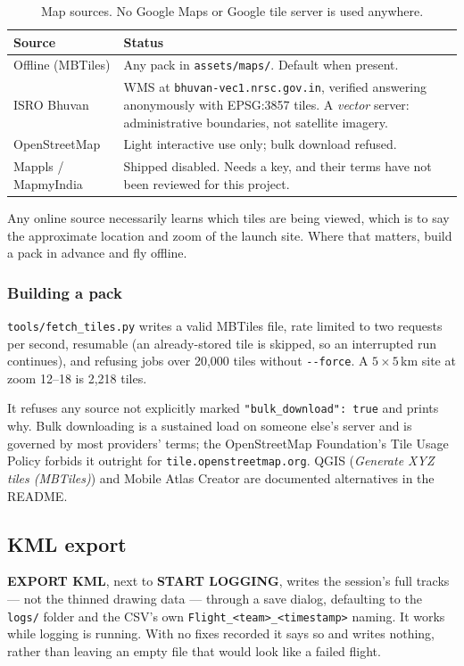 \documentclass[11pt,a4paper]{article}
\begin{document}
\begin{table}[htbp]
\centering
\begin{tabularx}{\textwidth}{@{}lX@{}}
\toprule
\textbf{Source} & \textbf{Status} \\
\midrule
Offline (MBTiles) & Any pack in \texttt{assets/maps/}. Default when present. \\
ISRO Bhuvan & WMS at \texttt{bhuvan-vec1.nrsc.gov.in}, verified answering
anonymously with EPSG:3857 tiles. A \emph{vector} server: administrative
boundaries, not satellite imagery. \\
OpenStreetMap & Light interactive use only; bulk download refused. \\
Mappls / MapmyIndia & Shipped disabled. Needs a key, and their terms have
not been reviewed for this project. \\
\bottomrule
\end{tabularx}
\caption{Map sources. No Google Maps or Google tile server is used anywhere.}
\end{table}

Any online source necessarily learns which tiles are being viewed, which is
to say the approximate location and zoom of the launch site. Where that
matters, build a pack in advance and fly offline.

\subsubsection{Building a pack}

\texttt{tools/fetch\_tiles.py} writes a valid MBTiles file, rate limited to
two requests per second, resumable (an already-stored tile is skipped, so an
interrupted run continues), and refusing jobs over 20{,}000 tiles without
\texttt{-{}-force}. A $5\times5$\,km site at zoom 12--18 is 2{,}218 tiles.

It refuses any source not explicitly marked \texttt{"bulk\_download": true}
and prints why. Bulk downloading is a sustained load on someone else's
server and is governed by most providers' terms; the OpenStreetMap
Foundation's Tile Usage Policy forbids it outright for
\texttt{tile.openstreetmap.org}. QGIS (\emph{Generate XYZ tiles (MBTiles)})
and Mobile Atlas Creator are documented alternatives in the README.

\subsection{KML export}

\textbf{EXPORT KML}, next to \textbf{START LOGGING}, writes the session's
full tracks --- not the thinned drawing data --- through a save dialog,
defaulting to the \texttt{logs/} folder and the CSV's own
\texttt{Flight\_<team>\_<timestamp>} naming. It works while logging is
running. With no fixes recorded it says so and writes nothing, rather than
leaving an empty file that would look like a failed flight.
\end{document}
